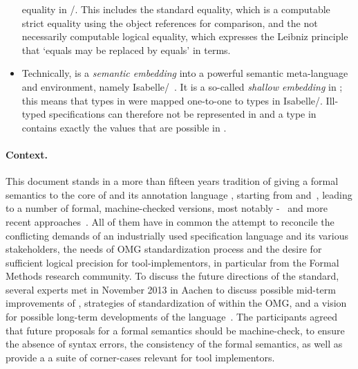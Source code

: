 \begin{itemize}
         equality in \UML/\OCL. This includes the standard equality, which is a
         computable strict equality using the object references for comparison,
         and the not necessarily computable logical equality, which expresses
         the Leibniz principle that `equals may be replaced by equals' in
         \OCL terms. 
 \item Technically,  \FOCL is a \emph{semantic embedding} into a
         powerful semantic meta-language and
         environment, namely Isabelle/\HOL~\cite{nipkow.ea:isabelle:2002}.
         It is a so-called \emph{shallow embedding} in \HOL; this means that types
         in \OCL were mapped one-to-one to types in Isabelle/\HOL.
         Ill-typed \OCL specifications can therefore not be represented in
          \FOCL and a type in  \FOCL contains exactly
         the values that are possible in \OCL\@.
\end{itemize}

\paragraph*{Context.} This document stands in a more than fifteen years
tradition of giving a formal semantics to the core of \UML and its
annotation language \OCL, starting from \citet{richters:precise:2002}
and~\cite{hamie.ea:reflections:1998,mandel.ea:ocl:1999,cook.ea::amsterdam:2002},
leading to a number of formal, machine-checked versions, most notably
\HOL-\OCL~\cite{brucker.ea:semantic:2006-b,brucker:interactive:2007,brucker.ea:hol-ocl-book:2006,brucker.ea:extensible:2008-b}
and more recent approaches~\cite{brucker.ea:path-expressions:2013}. All
of them have in common the attempt to reconcile the conflicting
demands of an industrially used specification language and its various
stakeholders, the needs of OMG standardization process and the desire
for sufficient logical precision for tool-implementors, in particular
from the Formal Methods research community.  To discuss the future
directions of the standard, several \OCL experts met in November 2013
in Aachen to discuss possible mid-term improvements of \OCL,
strategies of standardization of \OCL within the OMG, and a vision for
possible long-term developments of the
language~\cite{brucker.ea:summary-aachen:2013}. The participants
agreed that future proposals for a formal semantics should be
machine-check, to ensure the absence of syntax errors, the consistency
of the formal semantics, as well as provide a a suite of corner-cases
relevant for \OCL tool implementors.


